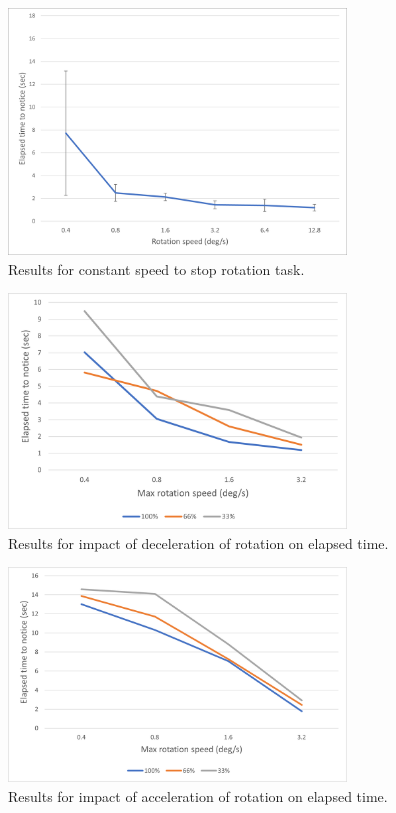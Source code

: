 \begin{figure}[H]\centering
	\includegraphics[width=0.8\textwidth]{Pictures/Stop to Six constant speeds.png}%
	\caption{Results for constant speed to stop rotation task.}\label{fig:Stop to Six constant speeds}%
	
\end{figure}
\begin{figure}[H]\centering
	\includegraphics[width=0.8\textwidth]{Pictures/Curvature distance for three decelerations at each constant speed.png}%
	\caption{Results for impact of deceleration of rotation on elapsed time.}\label{fig:Three deceleration of rotation}%
	
\end{figure}
\begin{figure}[H]\centering
	\includegraphics[width=0.8\textwidth]{Pictures/Three acceleration of rotation.png}%
	\caption{Results for impact of acceleration of rotation on elapsed time.}\label{fig:Three acceleration of rotation}%
	
\end{figure}



